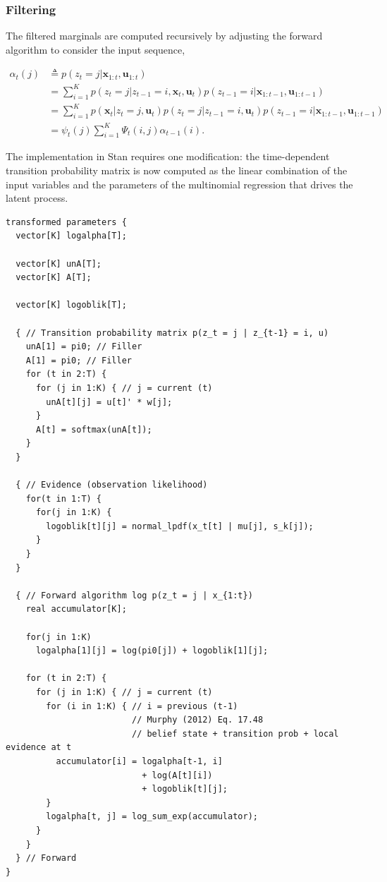 \documentclass[]{article}
\newcommand{\mat}[1]{\mathbf{#1}}
\begin{document}
{{{\subsubsection{Filtering}\label{filtering-1}

The filtered marginals are computed recursively by adjusting the forward
algorithm to consider the input sequence,

\begin{align*}
\alpha_t(j)
  & \triangleq p(z_t = j | \mat{x}_{1:t}, \mat{u}_{1:t}) \\
  & = \sum_{i = 1}^{K}{p(z_t = j | z_{t-1} = i, \mat{x}_{t}, \mat{u}_{t}) p(z_{t-1} = i | \mat{x}_{1:t-1}, \mat{u}_{1:t-1})} \\
  & = \sum_{i = 1}^{K}{p(\mat{x}_{t} | z_t = j, \mat{u}_t) p(z_t = j | z_{t-1} = i, \mat{u}_{t}) p(z_{t-1} = i | \mat{x}_{1:t-1}, \mat{u}_{1:t-1})} \\
  & = \psi_t(j) \sum_{i = 1}^{K}{\Psi_t(i, j) \alpha_{t-1}(i)}.
\end{align*}

The implementation in Stan requires one modification: the time-dependent
transition probability matrix is now computed as the linear combination
of the input variables and the parameters of the multinomial regression
that drives the latent process.

\begin{verbatim}
transformed parameters {
  vector[K] logalpha[T];

  vector[K] unA[T];
  vector[K] A[T];

  vector[K] logoblik[T];

  { // Transition probability matrix p(z_t = j | z_{t-1} = i, u)
    unA[1] = pi0; // Filler
    A[1] = pi0; // Filler
    for (t in 2:T) {
      for (j in 1:K) { // j = current (t)
        unA[t][j] = u[t]' * w[j];
      }
      A[t] = softmax(unA[t]);
    }
  }

  { // Evidence (observation likelihood)
    for(t in 1:T) {
      for(j in 1:K) {
        logoblik[t][j] = normal_lpdf(x_t[t] | mu[j], s_k[j]);
      }
    }
  }

  { // Forward algorithm log p(z_t = j | x_{1:t})
    real accumulator[K];

    for(j in 1:K)
      logalpha[1][j] = log(pi0[j]) + logoblik[1][j];

    for (t in 2:T) {
      for (j in 1:K) { // j = current (t)
        for (i in 1:K) { // i = previous (t-1)
                         // Murphy (2012) Eq. 17.48
                         // belief state + transition prob + local evidence at t
          accumulator[i] = logalpha[t-1, i] 
                           + log(A[t][i]) 
                           + logoblik[t][j];
        }
        logalpha[t, j] = log_sum_exp(accumulator);
      }
    }
  } // Forward
}
\end{verbatim}

}}}
\end{document}
